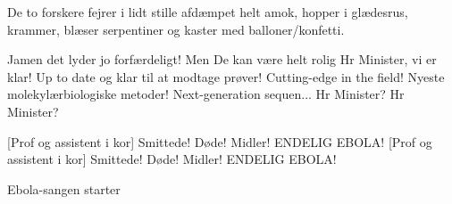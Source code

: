 \documentclass[a4paper,11pt]{article}
\begin{document}
\begin{sketch}

\scene De to forskere fejrer i lidt stille afdæmpet helt amok, hopper i glædesrus, krammer, blæser serpentiner og kaster med balloner/konfetti.

 Jamen det lyder jo forfærdeligt! Men De kan være helt rolig Hr Minister, vi er klar! Up to date og klar til at modtage prøver! Cutting-edge in the field! Nyeste molekylærbiologiske metoder! Next-generation sequen... Hr Minister? Hr Minister?


[Prof og assistent i kor] Smittede! Døde! Midler! ENDELIG EBOLA!
[Prof og assistent i kor] Smittede! Døde! Midler! ENDELIG EBOLA!

\scene Ebola-sangen starter

\end{sketch}
\end{document}

